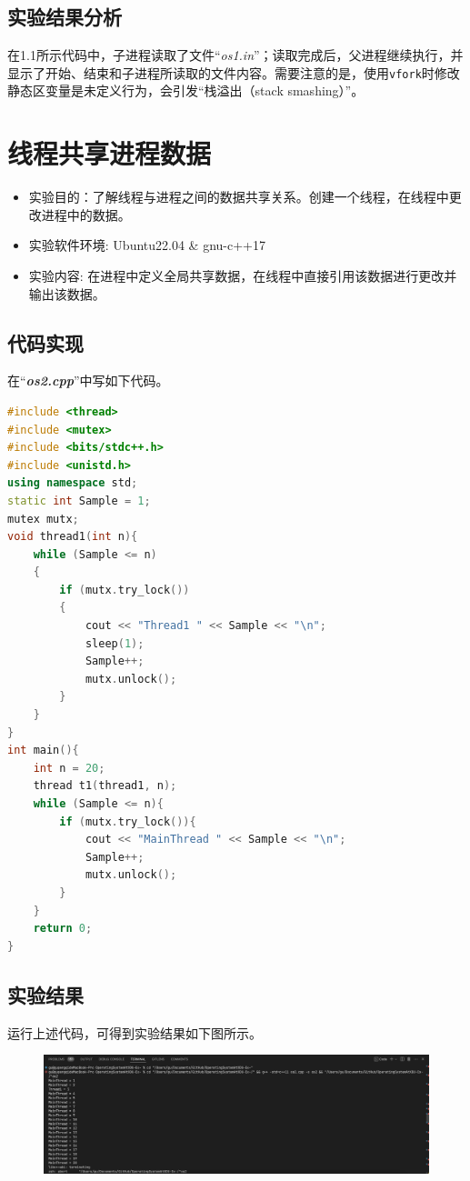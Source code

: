 \documentclass[UTF8]{ctexart}
\begin{document}
\subsection{实验结果分析}
在1.1所示代码中，子进程读取了文件“\textit{os1.in}”；读取完成后，父进程继续执行，并显示了开始、结束和子进程所读取的文件内容。需要注意的是，使用\texttt{vfork}时修改静态区变量是未定义行为，会引发“栈溢出（stack smashing）”。
\section{线程共享进程数据}
\begin{itemize}
	\item 实验目的：了解线程与进程之间的数据共享关系。创建一个线程，在线程中更改进程中的数据。
	\item 实验软件环境: Ubuntu22.04 \& gnu-c++17
	\item 实验内容: 在进程中定义全局共享数据，在线程中直接引用该数据进行更改并输出该数据。
\end{itemize}
\subsection{代码实现}
在“\textbf{\textit{os2.cpp}}”中写如下代码。
\begin{lstlisting}[language=c++]
#include <thread>
#include <mutex>
#include <bits/stdc++.h>
#include <unistd.h>
using namespace std;
static int Sample = 1;
mutex mutx;
void thread1(int n){
	while (Sample <= n)
	{
		if (mutx.try_lock())
		{
			cout << "Thread1 " << Sample << "\n";
			sleep(1);
			Sample++;
			mutx.unlock();
		}
	}
}
int main(){
	int n = 20;
	thread t1(thread1, n);
	while (Sample <= n){
		if (mutx.try_lock()){
			cout << "MainThread " << Sample << "\n";
			Sample++;
			mutx.unlock();
		}
	}
	return 0;
}
	\end{lstlisting}
\subsection{实验结果}
运行上述代码，可得到实验结果如下图所示。
\begin{figure}
	\begin{center}
		\includegraphics[width=0.7\pdfpagewidth]{os2.png}
	\end{center}
\end{figure}
\end{document}
